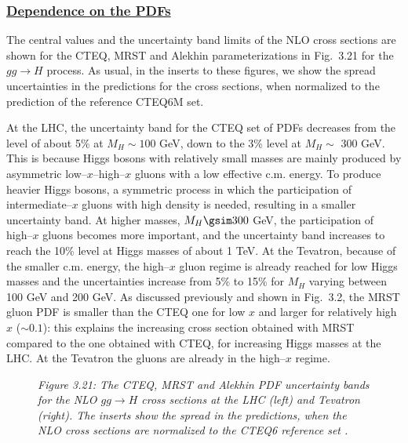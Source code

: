 \vspace*{-6mm} 
\subsubsection*{\underline{Dependence on the PDFs}}

The  central values and the uncertainty band limits of the NLO cross sections 
are shown for the CTEQ, MRST and Alekhin parameterizations in Fig.~3.21 for
the $gg \to H$ process. As usual, in the inserts to these figures, we show
the spread uncertainties in the predictions for the cross sections, when
normalized to the prediction of the reference CTEQ6M set.\s

At the LHC, the uncertainty band for the CTEQ set of PDFs  decreases from the
level of about 5\% at $M_{H} \sim 100$ GeV, down to the 3\% level at $M _H
\sim$ 300 GeV.  This is because Higgs bosons with relatively small masses  are
mainly  produced by  asymmetric  low--$x$--high--$x$ gluons with a low effective
c.m. energy. To produce heavier Higgs bosons, a symmetric process in which the
participation of intermediate--$x$ gluons with high density is needed,
resulting in a smaller  uncertainty band. At higher masses, $M_H \gsim 300$
GeV, the participation of  high--$x$ gluons becomes more important, and the
uncertainty band increases to reach the 10\% level at Higgs masses of about 1
TeV. At the Tevatron, because of  the smaller c.m.  energy, the high--$x$ gluon
regime is already reached for low Higgs masses and the uncertainties increase
from 5\% to 15\% for $M_H$ varying between 100 GeV and 200 GeV. As discussed
previously and shown in Fig.~3.2, the MRST  gluon PDF is smaller than the CTEQ 
one for low $x$ and larger for relatively high $x$ ($\sim 0.1$): this explains 
the increasing cross section obtained with MRST compared to the one obtained 
with CTEQ, for increasing Higgs masses  at the LHC.  At the  Tevatron the gluons
are already in the high--$x$ regime. \s

\begin{figure}[hbtp]
\begin{center}
\vspace*{-2.2cm}
\hspace*{-1cm}
\vspace*{-14.3cm}
\end{center}
{\it Figure 3.21: The CTEQ, MRST and Alekhin PDF uncertainty bands for the NLO
$gg \to H$ cross sections at the LHC (left) and Tevatron (right). The inserts 
show the spread in the predictions, when the NLO cross sections are
normalized to the CTEQ6 reference set \cite{Samir}.}
\vspace*{-5mm} 
\end{figure}

